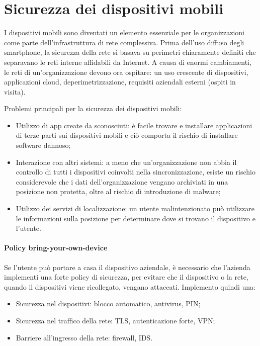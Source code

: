 \section{Sicurezza dei dispositivi mobili}

I dispositivi mobili sono diventati un elemento essenziale per le organizzazioni come parte dell'infrastruttura di rete complessiva. Prima dell'uso diffuso degli smartphone, la sicurezza della rete si basava su perimetri chiaramente definiti che separavano le reti interne affidabili da Internet. A causa di enormi cambiamenti, le reti di un'organizzazione devono ora ospitare: un uso crescente di dispositivi, applicazioni cloud, deperimetrizzazione, requisiti aziendali esterni (ospiti in visita).

Problemi principali per la sicurezza dei dispositivi mobili:
\begin{itemize}
    \item Utilizzo di app create da sconosciuti: è facile trovare e installare applicazioni di terze parti sui dispositivi mobili e ciò comporta il rischio di installare software dannoso;
	\item Interazione con altri sistemi: a meno che un'organizzazione non abbia il controllo di tutti i dispositivi coinvolti nella sincronizzazione, esiste un rischio considerevole che i dati dell'organizzazione vengano archiviati in una posizione non protetta, oltre al rischio di introduzione di malware;
	\item Utilizzo dei servizi di localizzazione: un utente malintenzionato può utilizzare le informazioni sulla posizione per determinare dove si trovano il dispositivo e l'utente.
\end{itemize}

\paragraph{Policy bring-your-own-device} Se l'utente può portare a casa il dispositivo aziendale, è necessario che l'azienda implementi una forte policy di sicurezza, per evitare che il dispositivo o la rete, quando il dispositivi viene ricollegato, vengano attaccati. Implemento quindi una:
\begin{itemize}
    \item Sicurezza nel dispositivi: blocco automatico, antivirus, PIN;
	\item Sicurezza nel traffico della rete: TLS, autenticazione forte, VPN;
	\item Barriere all'ingresso della rete: firewall, IDS.
\end{itemize}

